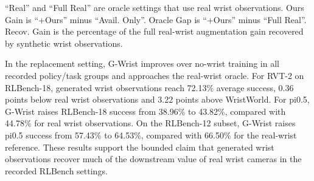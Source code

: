 \documentclass[letterpaper]{article}
\newcommand{\method}{G-Wrist}
\begin{document}
\begin{table}[t]
\centering
\scriptsize
\setlength{\tabcolsep}{3.6pt}
\caption{
Policy-grounded evaluation on RLBench.
Replacement evaluates alternatives for the Wrist-Withheld Split.
Augmentation starts from the Available-Wrist Split and adds the Wrist-Withheld Split with different wrist-view sources.
All values are average success rates in percentage; WW denotes WristWorld.
}
\label{tab:rlbench_policy}
\vspace{2pt}

\footnotesize{
``Real'' and ``Full Real'' are oracle settings that use real wrist observations.
Ours Gain is ``+Ours'' minus ``Avail. Only''.
Oracle Gap is ``+Ours'' minus ``Full Real''.
Recov. Gain is the percentage of the full real-wrist augmentation gain recovered by synthetic wrist observations.
}
\end{table}

In the replacement setting, \method{} improves over no-wrist training in all recorded policy/task groups and approaches the real-wrist oracle.
For RVT-2 on RLBench-18, generated wrist observations reach 72.13\% average success, 0.36 points below real wrist observations and 3.22 points above WristWorld.
For pi0.5, \method{} raises RLBench-18 success from 38.96\% to 43.82\%, compared with 44.78\% for real wrist observations.
On the RLBench-12 subset, \method{} raises pi0.5 success from 57.43\% to 64.53\%, compared with 66.50\% for the real-wrist reference.
These results support the bounded claim that generated wrist observations recover much of the downstream value of real wrist cameras in the recorded RLBench settings.
\end{document}
